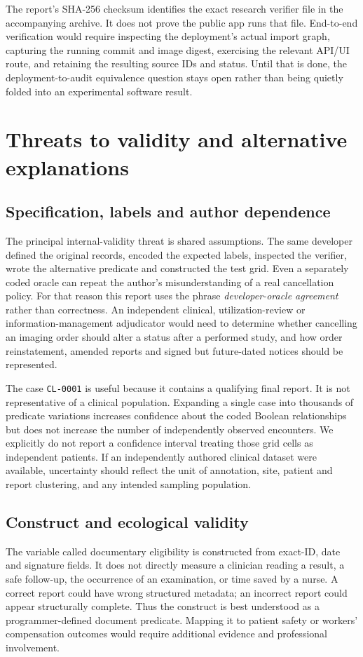 \documentclass[11pt,twocolumn]{article}
\newcommand{\code}[1]{\texttt{#1}}
\begin{document}
The report's SHA-256 checksum identifies the exact research verifier file in the accompanying archive. It does not prove the public app runs that file. End-to-end verification would require inspecting the deployment's actual import graph, capturing the running commit and image digest, exercising the relevant API/UI route, and retaining the resulting source IDs and status. Until that is done, the deployment-to-audit equivalence question stays open rather than being quietly folded into an experimental software result.
\section{Threats to validity and alternative explanations}\label{sec:validity}
\subsection{Specification, labels and author dependence}
The principal internal-validity threat is shared assumptions. The same developer defined the original records, encoded the expected labels, inspected the verifier, wrote the alternative predicate and constructed the test grid. Even a separately coded oracle can repeat the author's misunderstanding of a real cancellation policy. For that reason this report uses the phrase \emph{developer-oracle agreement} rather than correctness. An independent clinical, utilization-review or information-management adjudicator would need to determine whether cancelling an imaging order should alter a status after a performed study, and how order reinstatement, amended reports and signed but future-dated notices should be represented.

The case \code{CL-0001} is useful because it contains a qualifying final report. It is not representative of a clinical population. Expanding a single case into thousands of predicate variations increases confidence about the coded Boolean relationships but does not increase the number of independently observed encounters. We explicitly do not report a confidence interval treating those grid cells as independent patients. If an independently authored clinical dataset were available, uncertainty should reflect the unit of annotation, site, patient and report clustering, and any intended sampling population.

\subsection{Construct and ecological validity}
The variable called documentary eligibility is constructed from exact-ID, date and signature fields. It does not directly measure a clinician reading a result, a safe follow-up, the occurrence of an examination, or time saved by a nurse. A correct report could have wrong structured metadata; an incorrect report could appear structurally complete. Thus the construct is best understood as a programmer-defined document predicate. Mapping it to patient safety or workers' compensation outcomes would require additional evidence and professional involvement.
\end{document}
